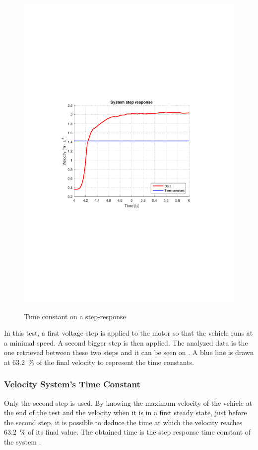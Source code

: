 \begin{figure}[H]
  \centering
  {
    \includegraphics[width=1.0\textwidth]{figures/systemTimeConstant.pdf}
  }
  \caption{Time constant on a step-response}
  \label{fig:systemTimeConstant}
\end{figure}
%
In this test, a first voltage step is applied to the motor so that the vehicle runs at a minimal speed. A second bigger step is then applied. The analyzed data is the one retrieved between these two steps and it can be seen on . A blue line is drawn at \si{\num{63,2} \%} of the final velocity to represent the time constants.

\subsubsection{Velocity System's Time Constant}
Only the second step is used. By knowing the maximum velocity of the vehicle at the end of the test and the velocity when it is in a first steady state, just before the second step, it is possible to deduce the time at which the velocity reaches \si{\num{63,2} \%} of its final value. The obtained time is the step response time constant of the system \si{\tau}.


